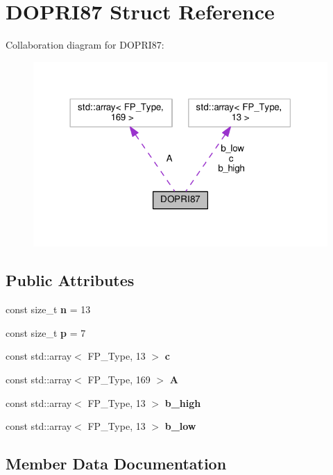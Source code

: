 \hypertarget{structDOPRI87}{}\section{D\+O\+P\+R\+I87 Struct Reference}
\label{structDOPRI87}


Collaboration diagram for D\+O\+P\+R\+I87\+:\nopagebreak
\begin{figure}[H]
\begin{center}
\leavevmode
\includegraphics[width=318pt]{structDOPRI87__coll__graph}
\end{center}
\end{figure}
\subsection*{Public Attributes}
\begin{DoxyCompactItemize}
\item 
\mbox{\label{structDOPRI87_a5be2549f8041e5c535e477493f284ccb}} 
const size\+\_\+t {\bfseries n} = 13
\item 
\mbox{\label{structDOPRI87_a765f5d126f15435e636c9f38a554f35f}} 
const size\+\_\+t {\bfseries p} = 7
\item 
const std\+::array$<$ F\+P\+\_\+\+Type, 13 $>$ {\bfseries c}
\item 
const std\+::array$<$ F\+P\+\_\+\+Type, 169 $>$ {\bfseries A}
\item 
const std\+::array$<$ F\+P\+\_\+\+Type, 13 $>$ {\bfseries b\+\_\+high}
\item 
const std\+::array$<$ F\+P\+\_\+\+Type, 13 $>$ {\bfseries b\+\_\+low}
\end{DoxyCompactItemize}


\subsection{Member Data Documentation}
\mbox{\label{structDOPRI87_a58504e2f3eabbf35b2d4f0e54ebb8d5f}} 
